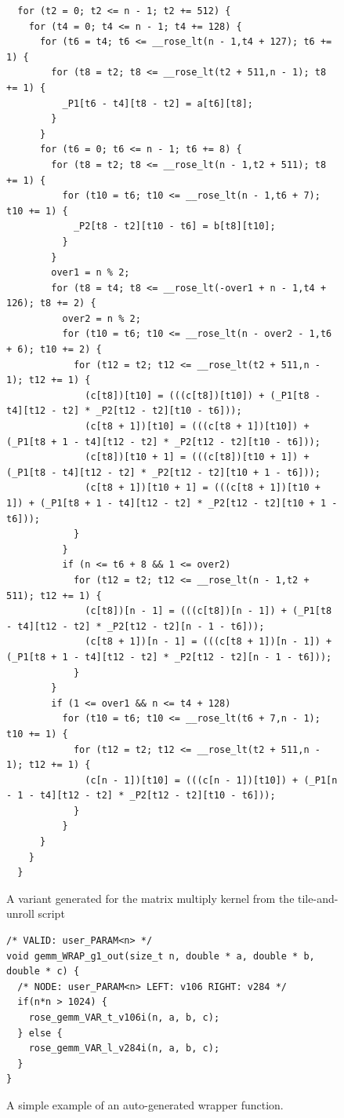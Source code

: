 \documentclass[msthesis,justified,copyright,final,numbers,sort&compress,
gsmodern,amstex,natbib]{uothesis}
\begin{document}
\begin{figure}[tbp]
\centering
\scriptsize\begin{verbatim}
  for (t2 = 0; t2 <= n - 1; t2 += 512) {
    for (t4 = 0; t4 <= n - 1; t4 += 128) {
      for (t6 = t4; t6 <= __rose_lt(n - 1,t4 + 127); t6 += 1) {
        for (t8 = t2; t8 <= __rose_lt(t2 + 511,n - 1); t8 += 1) {
          _P1[t6 - t4][t8 - t2] = a[t6][t8];
        }
      }
      for (t6 = 0; t6 <= n - 1; t6 += 8) {
        for (t8 = t2; t8 <= __rose_lt(n - 1,t2 + 511); t8 += 1) {
          for (t10 = t6; t10 <= __rose_lt(n - 1,t6 + 7); t10 += 1) {
            _P2[t8 - t2][t10 - t6] = b[t8][t10];
          }
        }
        over1 = n % 2;
        for (t8 = t4; t8 <= __rose_lt(-over1 + n - 1,t4 + 126); t8 += 2) {
          over2 = n % 2;
          for (t10 = t6; t10 <= __rose_lt(n - over2 - 1,t6 + 6); t10 += 2) {
            for (t12 = t2; t12 <= __rose_lt(t2 + 511,n - 1); t12 += 1) {
              (c[t8])[t10] = (((c[t8])[t10]) + (_P1[t8 - t4][t12 - t2] * _P2[t12 - t2][t10 - t6]));
              (c[t8 + 1])[t10] = (((c[t8 + 1])[t10]) + (_P1[t8 + 1 - t4][t12 - t2] * _P2[t12 - t2][t10 - t6]));
              (c[t8])[t10 + 1] = (((c[t8])[t10 + 1]) + (_P1[t8 - t4][t12 - t2] * _P2[t12 - t2][t10 + 1 - t6]));
              (c[t8 + 1])[t10 + 1] = (((c[t8 + 1])[t10 + 1]) + (_P1[t8 + 1 - t4][t12 - t2] * _P2[t12 - t2][t10 + 1 - t6]));
            }
          }
          if (n <= t6 + 8 && 1 <= over2) 
            for (t12 = t2; t12 <= __rose_lt(n - 1,t2 + 511); t12 += 1) {
              (c[t8])[n - 1] = (((c[t8])[n - 1]) + (_P1[t8 - t4][t12 - t2] * _P2[t12 - t2][n - 1 - t6]));
              (c[t8 + 1])[n - 1] = (((c[t8 + 1])[n - 1]) + (_P1[t8 + 1 - t4][t12 - t2] * _P2[t12 - t2][n - 1 - t6]));
            }
        }
        if (1 <= over1 && n <= t4 + 128) 
          for (t10 = t6; t10 <= __rose_lt(t6 + 7,n - 1); t10 += 1) {
            for (t12 = t2; t12 <= __rose_lt(t2 + 511,n - 1); t12 += 1) {
              (c[n - 1])[t10] = (((c[n - 1])[t10]) + (_P1[n - 1 - t4][t12 - t2] * _P2[t12 - t2][t10 - t6]));
            }
          }
      }
    }
  }
\end{verbatim}
\caption[A variant generated for the matrix multiply kernel from the tile-and-unroll \newline script]{A variant generated for the matrix multiply kernel from the tile-and-unroll script}
\label{fig:codevariant}
\end{figure}

\begin{figure}[btp]
\centering
\scriptsize\begin{verbatim}
/* VALID: user_PARAM<n> */
void gemm_WRAP_g1_out(size_t n, double * a, double * b, double * c) {
  /* NODE: user_PARAM<n> LEFT: v106 RIGHT: v284 */
  if(n*n > 1024) {
    rose_gemm_VAR_t_v106i(n, a, b, c);
  } else {
    rose_gemm_VAR_l_v284i(n, a, b, c);
  }
}
\end{verbatim}
\caption[An auto-generated wrapper function]{A simple example of an auto-generated wrapper function.}
\label{fig:wrapperfun}
\end{figure}
\end{document}
